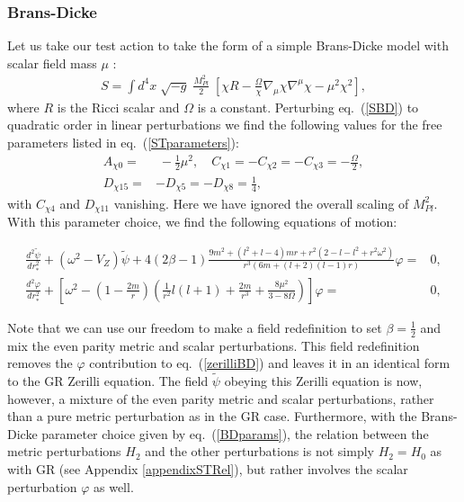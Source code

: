 \documentclass[10pt,twocolumn,preprintnumbers,amsmath,amssymb,nofootinbib
,superscriptaddress]{revtex4-1}
\begin{document}
{\subsubsection{Brans-Dicke}
Let us take our test action to take the form of a simple Brans-Dicke model with scalar field mass $\mu$ \cite{PhysRevD.34.333}:
\begin{align}
S=\int d^4x\;\sqrt{-g}\;\frac{M_{Pl}^2}{2}\;\left[\chi R-\frac{\Omega}{\chi}\nabla_\mu \chi \nabla^\mu \chi -\mu^2\chi^2\right], \label{SBD}
\end{align}
where $R$ is the Ricci scalar and $\Omega$ is a constant. Perturbing eq.~(\ref{SBD}) to quadratic order in linear perturbations we find the following values for the free parameters listed in eq.~(\ref{STparameters}):
\begin{align}
A_{\chi0}=&\;-\frac{1}{2}\mu^2,\quad C_{\chi1}=-C_{\chi2}=-C_{\chi3}=-\frac{\Omega}{2},\nonumber\\
D_{\chi15}=&-D_{\chi5}=-D_{\chi8}=\frac{1}{4},\label{BDparams}
\end{align}
with $C_{\chi4}$ and $D_{\chi11}$ vanishing. Here we have ignored the overall scaling of $M_{Pl}^2$. With this parameter choice, we find the following equations of motion:
\begin{widetext}
\begin{align}
\frac{d^2\tilde{\psi}}{dr_\ast^2}+\left(\omega^2-V_Z\right)\tilde{\psi}+4(2\beta-1)\frac{9m^2+\left(l^2+l-4\right)mr+r^2\left(2-l-l^2+r^2\omega^2\right)}{r^3\left(6m+(l+2)(l-1)r\right)}\varphi=&0,\label{zerilliBD}\\
\frac{d^2\varphi}{dr_\ast^2}+\left[\omega^2-\left(1-\frac{2m}{r}\right)\left(\frac{1}{r^2}l(l+1)+\frac{2 m}{r^3}+\frac{8\mu^2}{3-8\Omega}\right)\right]\varphi=&0,
\end{align}
\end{widetext}
Note that we can use our freedom to make a field redefinition to set $\beta=\frac{1}{2}$ and mix the even parity metric and scalar perturbations. This field redefinition removes the $\varphi$ contribution to eq.~(\ref{zerilliBD}) and leaves it in an identical form to the GR Zerilli equation. The field $\tilde{\psi}$ obeying this Zerilli equation is now, however, a mixture of the even parity metric and scalar perturbations, rather than a pure metric perturbation as in the GR case. Furthermore, with the Brans-Dicke parameter choice given by eq.~(\ref{BDparams}), the relation between the metric perturbations $H_2$ and the other perturbations is not simply $H_2=H_0$ as with GR (see Appendix \ref{appendixSTRel}), but rather involves the scalar perturbation $\varphi$ as well.

}
\end{document}
